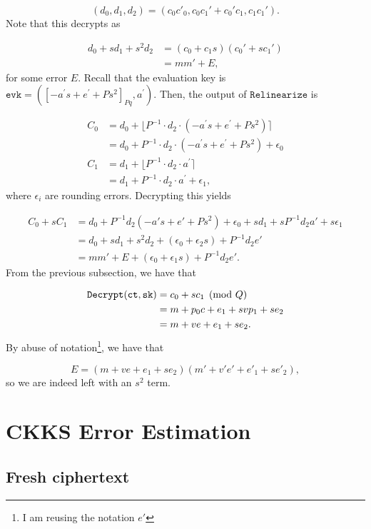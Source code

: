 \documentclass[a4paper,10pt]{article}
\begin{document}
\[	(d_0, d_1, d_2) = (c_0c'_0, c_0c_1' + c_0'c_1, c_1c_1').			\]
Note that this decrypts as 

\begin{align*}
	d_0 + sd_1 + s^2d_2 & = (c_0 + c_1s)(c_0' + sc_1') \\
										& = mm' + E,
\end{align*}
for some error $E$. Recall that the evaluation key is 
\(\texttt{evk} = \left([-a^\prime s + e^\prime + Ps^2]_{Pq} , a^\prime \right)\). Then, the output
of $\texttt{Relinearize}$ is

\begin{align*}
	C_0 & = d_0 + \lfloor P^{-1} \cdot d_2 \cdot (-a^\prime s + e^\prime + Ps^2) \rceil \\
			 & = d_0 + P^{-1} \cdot d_2 \cdot (-a^\prime s + e^\prime + Ps^2) + \epsilon_0 \\
	C_1  & = d_1 + \lfloor P^{-1} \cdot d_2 \cdot a^\prime \rceil \\
			 & = d_1 + P^{-1} \cdot d_2 \cdot a^\prime + \epsilon_1,
\end{align*}
where $\epsilon_i$ are rounding errors. Decrypting this yields

\begin{align*}
	C_0 + sC_1 & = d_0 + P^{-1}d_2(-a's + e' + Ps^2) + \epsilon_0 + sd_1 + sP^{-1}d_2a' + s\epsilon_1 \\
						  & = d_0 + sd_1 + s^2d_2 + (\epsilon_0 + \epsilon_2s) + P^{-1}d_2e' \\
						  & = mm' + E + (\epsilon_0 + \epsilon_1s) + P^{-1}d_2e'.
\end{align*}
From the previous subsection, we have that

\begin{align*}
	\texttt{Decrypt}(\texttt{ct}, \texttt{sk}) & = c_0 + sc_1 \pmod{Q} \\
                   & = m + p_0c + e_1 + svp_1 + se_2 \\
                   & = m + ve + e_1 + se_2.
\end{align*}
By abuse of notation\footnote{I am reusing the notation $e'$}, we have that

\[ E = (m + ve + e_1 + se_2)(m' + v'e' + e'_1 + se'_2), \]
so we are indeed left with an $s^2$ term.


\section{CKKS Error Estimation}
\subsection{Fresh ciphertext}
\end{document}
